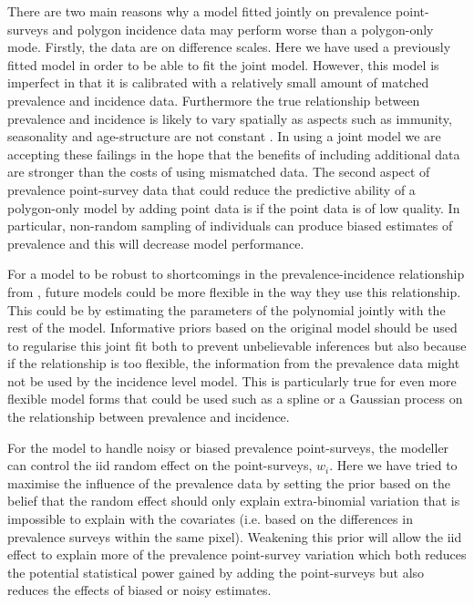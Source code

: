 \documentclass[10pt,letterpaper]{article}
\begin{document}

There are two main reasons why a model fitted jointly on prevalence point-surveys and polygon incidence data may perform worse than a polygon-only mode.
Firstly, the data are on difference scales.
Here we have used a previously fitted model \cite{cameron2015defining} in order to be able to fit the joint model.
However, this model is imperfect in that it is calibrated with a relatively small amount of matched prevalence and incidence data.
Furthermore the true relationship between prevalence and incidence is likely to vary spatially as aspects such as immunity, seasonality and age-structure are not constant \cite{cameron2015defining, battle2015defining,reiner2015seasonality}.
In using a joint model we are accepting these failings in the hope that the benefits of including additional data are stronger than the costs of using mismatched data.
The second aspect of prevalence point-survey data that could reduce the predictive ability of a polygon-only model by adding point data is if the point data is of low quality.
In particular, non-random sampling of individuals can produce biased estimates of prevalence and this will decrease model performance.


For a model to be robust to shortcomings in the prevalence-incidence relationship from \cite{cameron2015defining}, future models could be more flexible in the way they use this relationship.
This could be by estimating the parameters of the polynomial jointly with the rest of the model.
Informative priors based on the original model should be used to regularise this joint fit both to prevent unbelievable inferences but also because if the relationship is too flexible, the information from the prevalence data might not be used by the incidence level model.
This is particularly true for even more flexible model forms that could be used such as a spline or a Gaussian process on the relationship between prevalence and incidence.

For the model to handle noisy or biased prevalence point-surveys, the modeller can control the iid random effect on the point-surveys, $w_i$. 
Here we have tried to maximise the influence of the prevalence data by setting the prior based on the belief that the random effect should only explain extra-binomial variation that is impossible to explain with the covariates (i.e. based on the differences in prevalence surveys within the same pixel).
Weakening this prior will allow the iid effect to explain more of the prevalence point-survey variation which both reduces the potential statistical power gained by adding the point-surveys but also reduces the effects of biased or noisy estimates.
\end{document}
